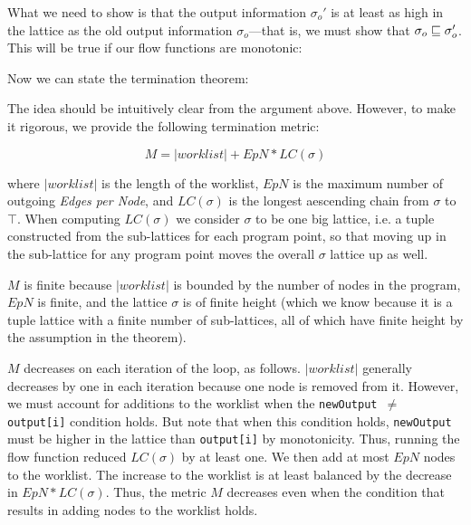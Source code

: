 \documentclass[11pt]{article}
\begin{document}
What we need to show is that the output information $\sigma_o'$ is at least as high in the lattice as the old output information $\sigma_o$---that is, we must show that $\sigma_o \sqsubseteq \sigma_o'$.  This will be true if our flow functions are monotonic:


\vspace{1em}

\noindent Now we can state the termination theorem:


\proof The idea should be intuitively clear from the argument above.  However, to make it rigorous, we provide the following termination metric:

\[
M = |worklist| + EpN * LC(\sigma)
\]

where $|worklist|$ is the length of the worklist, $EpN$ is the maximum number of outgoing \textit{Edges per Node}, and $LC(\sigma)$ is the longest aescending chain from $\sigma$ to $\top$.  When computing $LC(\sigma)$ we consider $\sigma$ to be one big lattice, i.e. a tuple constructed from the sub-lattices for each program point, so that moving up in the sub-lattice for any program point moves the overall $\sigma$ lattice up as well.

$M$ is finite because $|worklist|$ is bounded by the number of nodes in the program, $EpN$ is finite, and the lattice $\sigma$ is of finite height (which we know because it is a tuple lattice with a finite number of sub-lattices, all of which have finite height by the assumption in the theorem).

$M$ decreases on each iteration of the loop, as follows.  $|worklist|$ generally decreases by one in each iteration because one node is removed from it.  However, we must account for additions to the worklist when the \texttt{newOutput $\neq$ output[i]} condition holds.  But note that when this condition holds, \texttt{newOutput} must be higher in the lattice than \texttt{output[i]} by monotonicity.  Thus, running the flow function reduced $LC(\sigma)$ by at least one.  We then add at most $EpN$ nodes to the worklist.  The increase to the worklist is at least balanced by the decrease in $EpN * LC(\sigma)$.  Thus, the metric $M$ decreases even when the condition that results in adding nodes to the worklist holds.
\end{document}
